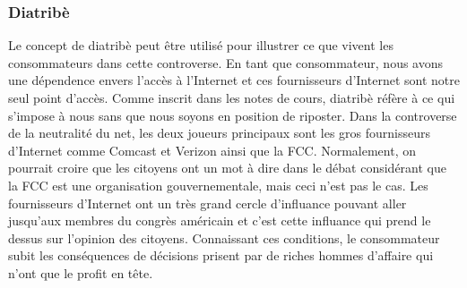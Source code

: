 \documentclass[12pt]{article}
\begin{document}
\subsubsection{Diatribè}
Le concept de diatribè peut être utilisé pour illustrer ce que vivent les consommateurs dans cette controverse. En tant que consommateur, nous avons une dépendence envers l'accès à l'Internet et ces fournisseurs d'Internet sont notre seul point d'accès. Comme inscrit dans les notes de cours, diatribè réfère à ce qui s'impose à nous sans que nous soyons en position de riposter. Dans la controverse de la neutralité du net, les deux joueurs principaux sont les gros fournisseurs d'Internet comme Comcast et Verizon ainsi que la FCC. Normalement, on pourrait croire que les citoyens ont un mot à dire dans le débat considérant que la FCC est une organisation gouvernementale, mais ceci n'est pas le cas. Les fournisseurs d'Internet ont un très grand cercle d'influance pouvant aller jusqu'aux membres du congrès américain et c'est cette influance qui prend le dessus sur l'opinion des citoyens. Connaissant ces conditions, le consommateur subit les conséquences de décisions prisent par de riches hommes d'affaire qui n'ont que le profit en tête.
\end{document}
